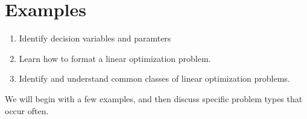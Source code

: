 \section{Examples}

\begin{outcome}

\begin{enumerate}
\item Identify decision variables and paramters
\item Learn how to format a linear optimization problem.
\item Identify and understand common classes of linear optimization problems.
\end{enumerate}
\end{outcome}

We will begin with a few examples, and then discuss specific problem types that occur often.


